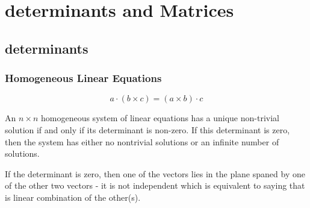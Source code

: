 \section{determinants and Matrices}

\subsection{determinants}

\subsubsection{Homogeneous Linear Equations}

$$
a \cdot (b \times c) = (a\times b) \cdot c
$$

An $n\times n$ homogeneous system of linear equations has a unique non-trivial solution
if and only if its determinant is non-zero.
If this determinant is zero, then the system has either no nontrivial solutions
or an infinite number of solutions.

If the determinant is zero, then one of the vectors lies in the plane spaned by one of the other
two vectors - it is not independent which is equivalent to saying that is linear combination of the other(s).